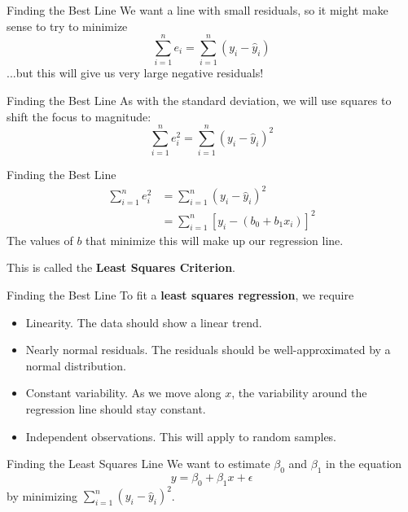 \begin{frame}{Finding the Best Line}
    We want a line with small residuals, so it might make sense to try to minimize 
    \[
        \sum_{i=1}^n e_i = \sum_{i=1}^n (y_i - \hat{y}_i)
    \]
    ...but this will give us very large negative residuals!
\end{frame}

\begin{frame}{Finding the Best Line}
    As with the standard deviation, we will use squares to shift the focus to magnitude:
    \[
        \sum_{i=1}^n e_i^2 = \sum_{i=1}^n (y_i - \hat{y}_i)^2
    \]
\end{frame}

\begin{frame}{Finding the Best Line}
    \begin{align*}
        \sum_{i=1}^n e_i^2 &= \sum_{i=1}^n (y_i - \hat{y}_i)^2 \\
                &= \sum_{i=1}^n [y_i - (b_0 + b_1 x_i)]^2
    \end{align*}
    The values of $b$ that minimize this will make up our regression line.
    
    \vspace{1cm}This is called the \textbf{Least Squares Criterion}.
\end{frame}

\begin{frame}{Finding the Best Line}
    To fit a \textbf{least squares regression}, we require
    \begin{itemize}
        \item Linearity. The data should show a linear trend.
        \item Nearly normal residuals. The residuals should be well-approximated by a normal distribution.
        \item Constant variability. As we move along $x$, the variability around the regression line should stay constant.
        \item Independent observations. This will apply to random samples.
    \end{itemize}
\end{frame}

\begin{frame}{Finding the Least Squares Line}
    We want to estimate $\beta_0$ and $\beta_1$ in the equation
    \[
        y = \beta_0 + \beta_1 x + \epsilon
    \]
    by minimizing $\sum_{i=1}^n (y_i - \hat{y}_i)^2$.
\end{frame}

